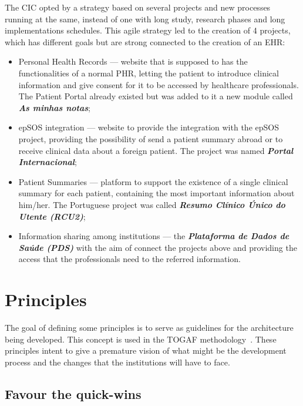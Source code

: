 The CIC opted by a strategy based on several projects and new processes running at the same, instead of one with long study, research phases and long implementations schedules. This agile strategy led to the creation of 4 projects, which has different goals but are strong connected to the creation of an EHR:

\begin{itemize}
\item Personal Health Records --- website that is supposed to has the functionalities of a normal PHR, letting the patient to introduce clinical information and give consent for it to be accessed by healthcare professionals. The Patient Portal already existed but was added to it a new module called \textit{\textbf{As minhas notas}}; 
\item epSOS integration --- website to provide the integration with the epSOS project, providing the possibility of send a patient summary abroad or to receive clinical data about a foreign patient. The project was named \textit{\textbf{Portal Internacional}};
\item Patient Summaries --- platform to support the existence of a single clinical summary for each patient, containing the most important information about him/her. The Portuguese project was called \textbf{\textit{Resumo Clínico Único do Utente (RCU2)}};
\item Information sharing among institutions --- the \textbf{\textit{Plataforma de Dados de Saúde (PDS)}} with the aim of connect the projects above and providing the access that the professionals need to the referred information.
\end{itemize}



\section{Principles}

The goal of defining some principles is to serve as guidelines for the architecture being developed. This concept is used in the TOGAF methodology~\citep{Josey2009, Josey2011}. These principles intent to give a premature vision of what might be the development process and the changes that the institutions will have to face.


\subsection{Favour the quick-wins}

